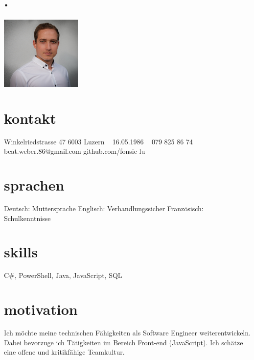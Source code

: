 \documentclass[]{cv-style} %
\begin{document}
\begin{aside}
\section{.}
\includegraphics[width=4cm]{portrait}
\section{kontakt}
Winkelriedstrasse 47
6003 Luzern
~
16.05.1986
~
079 825 86 74
beat.weber.86@gmail.com
github.com/fonsie-lu
\section{sprachen}
Deutsch: Muttersprache
Englisch: Verhandlungssicher 
Französisch: Schulkenntnisse
\section{skills}
C\#, PowerShell, Java, JavaScript, SQL
\end{aside}
\section{motivation}
  \vspace{-0.3cm}
Ich möchte meine technischen Fähigkeiten als Software Engineer weiterentwickeln. Dabei bevorzuge ich Tätigkeiten im Bereich Front-end (JavaScript). Ich schätze eine offene und kritikfähige Teamkultur.
\end{document}
